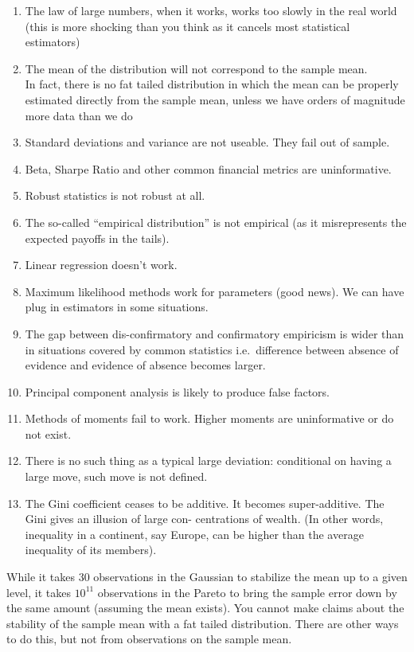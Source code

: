 \documentclass[
]{book}
\begin{document}
\begin{enumerate}
\def\labelenumi{\arabic{enumi})}
\item
  The law of large numbers, when it works, works too slowly in the real
  world (this is more shocking than you think as it cancels most statistical estimators)
\item
  The mean of the distribution will not correspond to the sample mean.\\
  In fact, there is no fat tailed distribution in which the mean can be properly
  estimated directly from the sample mean,
  unless we have orders of magnitude more data than we do
\item
  Standard deviations and variance are not useable. They fail out of sample.
\item
  Beta, Sharpe Ratio and other common financial metrics
  are uninformative.
\item
  Robust statistics is not robust at all.
\item
  The so-called ``empirical distribution'' is not empirical
  (as it misrepresents the expected payoffs in the tails).
\item
  Linear regression doesn't work.
\item
  Maximum likelihood methods work for parameters
  (good news). We can have plug in estimators in some
  situations.
\item
  The gap between dis-confirmatory and confirmatory
  empiricism is wider than in situations covered by common
  statistics i.e.~difference between absence of evidence and
  evidence of absence becomes larger.
\item
  Principal component analysis is likely to produce false
  factors.
\item
  Methods of moments fail to work. Higher moments are
  uninformative or do not exist.
\item
  There is no such thing as a typical large deviation:
  conditional on having a large move, such move is not
  defined.
\item
  The Gini coefficient ceases to be additive. It becomes
  super-additive. The Gini gives an illusion of large con-
  centrations of wealth. (In other words, inequality in a
  continent, say Europe, can be higher than the average
  inequality of its members).
\end{enumerate}

While it takes 30 observations in the Gaussian to stabilize
the mean up to a given level,
it takes \(10^{11}\) observations in the Pareto to bring the sample error down
by the same amount (assuming the mean exists).
You cannot make claims about the stability of the sample
mean with a fat tailed distribution. There are other ways to do
this, but not from observations on the sample mean.
\end{document}

